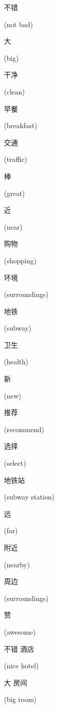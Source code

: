 \begin{CJK}{UTF8}{gbsn}不错\end{CJK} (not bad)
\begin{CJK}{UTF8}{gbsn}大\end{CJK} (big)
\begin{CJK}{UTF8}{gbsn}干净\end{CJK} (clean)
\begin{CJK}{UTF8}{gbsn}早餐\end{CJK} (breakfast)
\begin{CJK}{UTF8}{gbsn}交通\end{CJK} (traffic)
\begin{CJK}{UTF8}{gbsn}棒\end{CJK} (great)
\begin{CJK}{UTF8}{gbsn}近\end{CJK} (near)
\begin{CJK}{UTF8}{gbsn}购物\end{CJK} (shopping)
\begin{CJK}{UTF8}{gbsn}环境\end{CJK} (surroundings)
\begin{CJK}{UTF8}{gbsn}地铁\end{CJK} (subway)
\begin{CJK}{UTF8}{gbsn}卫生\end{CJK} (health)
\begin{CJK}{UTF8}{gbsn}新\end{CJK} (new)
\begin{CJK}{UTF8}{gbsn}推荐\end{CJK} (recommend)
\begin{CJK}{UTF8}{gbsn}选择\end{CJK} (select)
\begin{CJK}{UTF8}{gbsn}地铁站\end{CJK} (subway station)
\begin{CJK}{UTF8}{gbsn}远\end{CJK} (far)
\begin{CJK}{UTF8}{gbsn}附近\end{CJK} (nearby)
\begin{CJK}{UTF8}{gbsn}周边\end{CJK} (surroundings)
\begin{CJK}{UTF8}{gbsn}赞\end{CJK} (awesome)
\begin{CJK}{UTF8}{gbsn}不错 酒店\end{CJK} (nice hotel)
\begin{CJK}{UTF8}{gbsn}大 房间\end{CJK} (big room)
